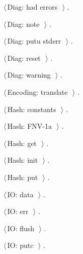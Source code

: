 \documentclass[11pt,a4paper,twoside,openright,DIV=15]{scrbook}
\theoremstyle{definition}
\theoremstyle{plain}
\theoremstyle{remark}
\begin{document}
{\begin{list}{}{\setlength{\itemsep}{-\parsep}\setlength{\itemindent}{-\leftmargin}}
\item $\langle\,$Diag: had errors\nobreak\ {\footnotesize {}}$\,\rangle$ {\footnotesize {\NWtxtRefIn} .}
\item $\langle\,$Diag: note\nobreak\ {\footnotesize {}}$\,\rangle$ {\footnotesize {\NWtxtRefIn} .}
\item $\langle\,$Diag: putu stderr\nobreak\ {\footnotesize {}}$\,\rangle$ {\footnotesize {\NWtxtRefIn} .}
\item $\langle\,$Diag: reset\nobreak\ {\footnotesize {}}$\,\rangle$ {\footnotesize {\NWtxtRefIn} .}
\item $\langle\,$Diag: warning\nobreak\ {\footnotesize {}}$\,\rangle$ {\footnotesize {\NWtxtRefIn} .}
\item $\langle\,$Encoding: translate\nobreak\ {\footnotesize {}}$\,\rangle$ {\footnotesize {\NWtxtRefIn} .}
\item $\langle\,$Hash: constants\nobreak\ {\footnotesize {}}$\,\rangle$ {\footnotesize {\NWtxtRefIn} .}
\item $\langle\,$Hash: FNV-1a\nobreak\ {\footnotesize {}}$\,\rangle$ {\footnotesize {\NWtxtRefIn} .}
\item $\langle\,$Hash: get\nobreak\ {\footnotesize {}}$\,\rangle$ {\footnotesize {\NWtxtRefIn} .}
\item $\langle\,$Hash: init\nobreak\ {\footnotesize {}}$\,\rangle$ {\footnotesize {\NWtxtRefIn} .}
\item $\langle\,$Hash: put\nobreak\ {\footnotesize {}}$\,\rangle$ {\footnotesize {\NWtxtRefIn} .}
\item $\langle\,$IO: data\nobreak\ {\footnotesize {}}$\,\rangle$ {\footnotesize {\NWtxtRefIn} .}
\item $\langle\,$IO: err\nobreak\ {\footnotesize {}}$\,\rangle$ {\footnotesize {\NWtxtRefIn} .}
\item $\langle\,$IO: flush\nobreak\ {\footnotesize {}}$\,\rangle$ {\footnotesize {\NWtxtRefIn} .}
\item $\langle\,$IO: putc\nobreak\ {\footnotesize {}}$\,\rangle$ {\footnotesize {\NWtxtRefIn} .}

\end{list}}
\end{document}
